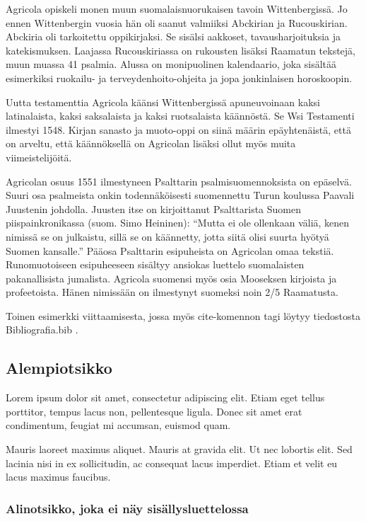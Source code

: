 Agricola opiskeli monen muun suomalaisnuorukaisen tavoin Wittenbergissä.
Jo ennen Wittenbergin vuosia hän oli saanut valmiiksi Abckirian ja
Rucouskirian. Abckiria oli tarkoitettu oppikirjaksi. Se sisälsi aakkoset,
tavausharjoituksia ja katekismuksen. Laajassa Rucouskiriassa on rukousten
lisäksi Raamatun tekstejä, muun muassa 41 psalmia. Alussa on monipuolinen
kalendaario, joka sisältää esimerkiksi ruokailu- ja terveydenhoito-ohjeita
ja jopa jonkinlaisen horoskoopin.

Uutta testamenttia Agricola käänsi Wittenbergissä apuneuvoinaan kaksi
latinalaista, kaksi saksalaista ja kaksi ruotsalaista käännöstä. Se
Wsi Testamenti il\-mestyi 1548. Kirjan sanasto ja muoto-oppi on siinä
määrin epäyhtenäistä, että on arveltu, että käännöksellä on Agricolan
lisäksi ollut myös muita viimeistelijöitä.

Agricolan osuus 1551 ilmestyneen Psalttarin psalmisuomennoksista on
epäselvä. Suuri osa psalmeista onkin todennäköisesti suomennettu Turun
koulussa Paavali Juustenin johdolla. Juusten itse on kirjoittanut
Psalttarista Suomen piispainkronikassa (suom. Simo Heininen): ``Mutta
ei ole ollenkaan väliä, kenen nimissä se on julkaistu, sillä se on
käännetty, jotta siitä olisi suurta hyötyä Suomen kansalle.'' Pääosa
Psalttarin esipuheista on Agricolan omaa tekstiä. Runomuotoiseen esipuheeseen
sisältyy ansiokas luettelo suomalaisten pakanallisista jumalista.
Agricola suomensi myös osia Mooseksen kirjoista ja profeetoista. Hänen
nimissään on ilmestynyt suomeksi noin 2/5 Raamatusta.

Toinen esimerkki viittaamisesta, jossa myös cite-komennon tagi löytyy
tiedostosta Bibliografia.bib \cite{puasuareanu2009survey}.

\subsection{Alempiotsikko}

\label{Alempiotsikko}

Lorem ipsum dolor sit amet, consectetur adipiscing elit. Etiam eget
tellus porttitor, tempus lacus non, pellentesque ligula. Donec sit
amet erat condimentum, feugiat mi accumsan, euismod quam.

Mauris laoreet maximus aliquet. Mauris at gravida elit. Ut nec lobortis
elit. Sed lacinia nisi in ex sollicitudin, ac consequat lacus imperdiet.
Etiam et velit eu lacus maximus faucibus.

\subsubsection{Alinotsikko, joka ei näy sisällysluettelossa}

